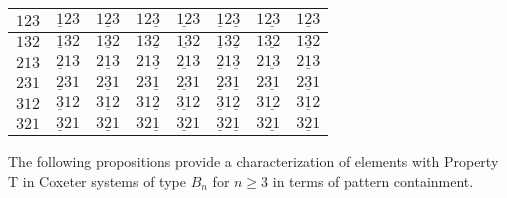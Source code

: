 \begin{center}
\begin{tabular}{|l|l|l|l|l|l|l|l|}
\hline
\cellcolor{white}$123$ & \cellcolor{white}$\underline{1}23$ & \cellcolor{white}$1\underline{2}3$ & \cellcolor{white}$12\underline{3}$ & \cellcolor{white}$\underline{12}3$ & \cellcolor{white}$\underline{1}2\underline{3}$ & \cellcolor{white}$1\underline{23}$ & \cellcolor{white}$\underline{123}$ \\
\hline
\cellcolor{white}$132$ & \cellcolor{white}$\underline{1}32$ & \cellcolor{white}$1\underline{3}2$ & \cellcolor{white}$13\underline{2}$ & \cellcolor{white}$\underline{13}2$ & \cellcolor{white}$\underline{1}3\underline{2}$ & \cellcolor{white}$1\underline{32}$ & \cellcolor{white}$\underline{132}$ \\
\hline
\cellcolor{white}$213$ & \cellcolor{white}$\underline{2}13$ & \cellcolor{white}$2\underline{1}3$ & \cellcolor{white}$21\underline{3}$ & \cellcolor{white}$\underline{21}3$ & \cellcolor{white}$\underline{2}1\underline{3}$ & \cellcolor{white}$2\underline{13}$ & \cellcolor{white}$\underline{213}$ \\
\hline
\cellcolor{white}$231$ & \cellcolor{white}$\underline{2}31$ & \cellcolor{white}$2\underline{3}1$ & \cellcolor{white}$23\underline{1}$ & \cellcolor{white}$\underline{23}1$ & \cellcolor{white}$\underline{2}3\underline{1}$ & \cellcolor{white}$2\underline{31}$ & \cellcolor{white}$\underline{231}$ \\
\hline
\cellcolor{white}$312$ & \cellcolor{white}$\underline{3}12$ & \cellcolor{white}$3\underline{1}2$ &\cellcolor{white}$31\underline{2}$ & \cellcolor{white}$\underline{31}2$ & \cellcolor{white}$\underline{3}1\underline{2}$ & \cellcolor{white}$3\underline{12}$ & \cellcolor{white}$\underline{312}$ \\
\hline
\cellcolor{white}$321$ & \cellcolor{white}$\underline{3}21$ & \cellcolor{white}$3\underline{2}1$ & \cellcolor{white}$32\underline{1}$ & \cellcolor{white}$\underline{32}1$ & \cellcolor{white}$\underline{3}2\underline{1}$ & \cellcolor{white}$3\underline{21}$ & \cellcolor{white}$\underline{321}$\\
\hline
\end{tabular}
\end{center}

The following propositions provide a characterization of elements with Property T in Coxeter systems of type $B_n$ for $n \geq 3$ in terms of pattern containment.

